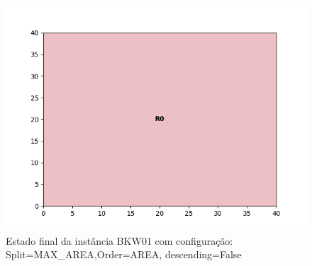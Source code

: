 \begin{figure}[H]
    \centering
    \caption[]{Estado final da instância BKW01 com configuração: Split=MAX_AREA,Order=AREA, descending=False}
    \label{fig:bkw01-max_area-area-false}
    \includegraphics[scale=0.5]{output/figures/bkw/bkw01/max_area/area/false/00}
\end{figure}